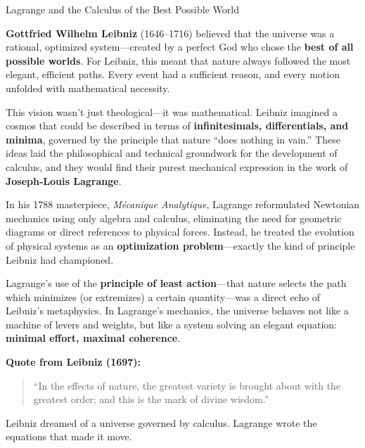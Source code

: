 \begin{HistoricalSidebar}{Lagrange and the Calculus of the Best Possible World}
    
        \textbf{Gottfried Wilhelm Leibniz} (1646–1716) believed that the universe was a rational, optimized system—created by a perfect God who chose the \textbf{best of all possible worlds}. For Leibniz, this meant that nature always followed the most elegant, efficient paths. Every event had a sufficient reason, and every motion unfolded with mathematical necessity.
    
        \medskip
    
        This vision wasn’t just theological—it was mathematical. Leibniz imagined a cosmos that could be described in terms of \textbf{infinitesimals, differentials, and minima}, governed by the principle that nature “does nothing in vain.” These ideas laid the philosophical and technical groundwork for the development of calculus, and they would find their purest mechanical expression in the work of \textbf{Joseph-Louis Lagrange}.
    
        \medskip
    
        In his 1788 masterpiece, \textit{Mécanique Analytique}, Lagrange reformulated Newtonian mechanics using only algebra and calculus, eliminating the need for geometric diagrams or direct references to physical forces. Instead, he treated the evolution of physical systems as an \textbf{optimization problem}—exactly the kind of principle Leibniz had championed.
    
        \medskip
    
        Lagrange’s use of the \textbf{principle of least action}—that nature selects the path which minimizes (or extremizes) a certain quantity—was a direct echo of Leibniz’s metaphysics. In Lagrange’s mechanics, the universe behaves not like a machine of levers and weights, but like a system solving an elegant equation: \textbf{minimal effort, maximal coherence}.
    
        \medskip
    
        \textbf{Quote from Leibniz (1697):}
        \begin{quote}
        “In the effects of nature, the greatest variety is brought about with the greatest order; and this is the mark of divine wisdom.”
        \end{quote}
    
        Leibniz dreamed of a universe governed by calculus. Lagrange wrote the equations that made it move.
    
\end{HistoricalSidebar}

